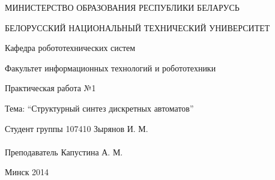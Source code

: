 \begin{titlepage} %

\thispagestyle{empty} %

\begin{center}
МИНИСТЕРСТВО ОБРАЗОВАНИЯ РЕСПУБЛИКИ БЕЛАРУСЬ

БЕЛОРУССКИЙ НАЦИОНАЛЬНЫЙ ТЕХНИЧЕСКИЙ УНИВЕРСИТЕТ

Кафедра робототехнических систем

Факультет информационных технологий и робототехники
\end{center}

\vfill

\begin{center}
Практическая работа №1

Тема: ``Структурный синтез дискретных автоматов''
\end{center}

\vfill

\noindent
Студент группы 107410 \hfill Зырянов И. М.
\\
\\
\noindent
Преподаватель \hfill Капустина А. М.

\vfill

\centerline{Минск 2014}

\clearpage %

\end{titlepage}

\setcounter{page}{2}
